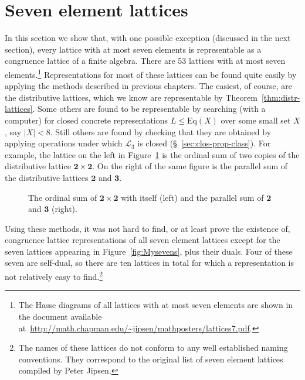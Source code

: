 \documentclass[cm,dissertation,actual,final]{uhthesis}
\theoremstyle{plain}
\theoremstyle{definition}
\theoremstyle{remark}
\numberwithin{theorem}{section}
\numberwithin{claim}{chapter}
\numberwithin{equation}{section}
\numberwithin{conjecture}{chapter}
\newcommand{\<}{\ensuremath{\langle}}
\renewcommand{\>}{\ensuremath{\rangle}}
\renewcommand{\leq}{\ensuremath{\leqslant}}
\newcommand{\Eq}{\ensuremath{\mathrm{Eq}}}
\newcommand{\0}{\ensuremath{\mathbf{0}}}
\newcommand{\1}{\ensuremath{\mathbf{1}}}
\newcommand{\2}{\ensuremath{\mathbf{2}}}
\newcommand{\3}{\ensuremath{\mathbf{3}}}
\newcommand{\4}{\ensuremath{\mathbf{4}}}
\newcommand{\5}{\ensuremath{\mathbf{5}}}
\newcommand{\sL}{\ensuremath{\mathscr{L}}}
\begin{document}
\section{Seven element lattices}
\label{sec:seven-elem-latt}
In this section we show that, with one possible exception (discussed in the next
section), every lattice with at 
most seven elements is representable as a congruence lattice of a finite algebra.
There are 53 lattices with at most seven elements.\footnote{The Hasse diagrams
  of all lattices with at most seven elements are shown
in the document available at~\url{http://math.chapman.edu/~jipsen/mathposters/lattices7.pdf}.}
Representations for most of these lattices can be found 
quite easily by applying the methods described in previous chapters.
The easiest, of course, are the distributive lattices, which we know are
representable by Theorem~\ref{thm:distr-lattices}.
Some others are found to be representable by searching (with a computer) for closed concrete
representations $L \leq \Eq(X)$ over some small set $X$, say $|X|<8$.
Still others are found by checking that they are obtained by applying
operations under which $\sL_3$ is closed (\S~\ref{sec:clos-prop-class}).  For
%
example, the lattice on the left in Figure~\ref{fig:ordinal-and-parallel-ex} is
%
%
the ordinal sum of two copies of the distributive lattice $\2 \times \2$.  On
the right of the same figure is the parallel sum of the distributive lattices
$\2$ and $\3$. 
\begin{figure}[h!]
\begin{multicols}{2}
\hskip4cm
  \begin{tikzpicture}[scale=.55]
    
  \end{tikzpicture}
  \par \vfill \columnbreak
\hskip1cm
  \begin{tikzpicture}[scale=.5]
    
  \end{tikzpicture}
\end{multicols}
  \caption{The ordinal sum of $\2\times \2$ with itself (left) and the parallel
    sum of $\2$ and $\3$ (right).}
  \label{fig:ordinal-and-parallel-ex}
\end{figure}

Using these methods, it was not hard to find, or at least prove the existence of,
congruence lattice representations of all seven element lattices except for the
seven lattices appearing in Figure~\ref{fig:Mysevens}, plus their duals.  Four of these
seven are self-dual, so there are ten lattices in total for which a
representation is not relatively easy to find.\footnote{The names of these lattices
  do not conform to any well established naming conventions.  They
  correspond to the original list of seven element lattices compiled by
%
  Peter Jipsen.}  
\end{document}
